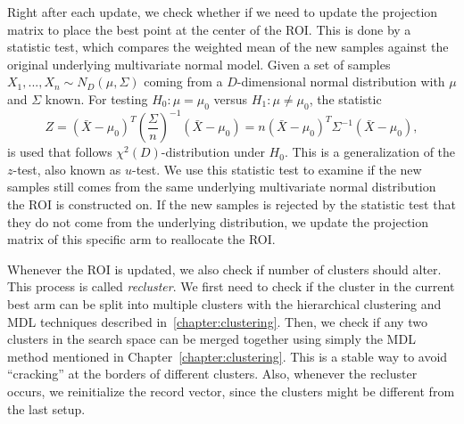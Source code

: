 Right after each update, we check whether if we need to update the projection matrix to place the best point at the center of the ROI.
This is done by a statistic test, which compares the weighted mean of the new samples against the original underlying multivariate normal model.
Given a set of samples $X_1, ..., X_n \sim N_{D}(\mu, \Sigma)$ coming from a $D$-dimensional normal distribution with $\mu$ and $\Sigma$ known. 
For testing $H_0: \mu = \mu_0$ versus $H_1: \mu \neq \mu_0$, the statistic
\begin{displaymath}
Z = ( \bar{X} - \mu_0 )^T (\frac{\Sigma}{n})^{-1} ( \bar{X} - \mu_0 ) = n( \bar{X} - \mu_0 )^T \Sigma^{-1} ( \bar{X} - \mu_0 ),
\end{displaymath}
is used that follows $ \chi^{2}(D)$-distribution under $H_0$.
This is a generalization of the $z$-test, also known as $u$-test.
We use this statistic test to examine if the new samples still comes from the same underlying multivariate normal distribution the ROI is constructed on.
If the new samples is rejected by the statistic test that they do not come from the underlying distribution, 
we update the projection matrix of this specific arm to reallocate the ROI.

Whenever the ROI is updated, we also check if number of clusters should alter.
This process is called \textit{recluster}.
We first need to check if the cluster in the current best arm can be split into multiple clusters 
with the hierarchical clustering and MDL techniques described in~\ref{chapter:clustering}.  
Then, we check if any two clusters in the search space can be merged together 
using simply the MDL method mentioned in Chapter~\ref{chapter:clustering}.  
This is a stable way to avoid ``cracking'' at the borders of different clusters.
Also, whenever the recluster occurs, we reinitialize the record vector, since the clusters might be different from the last setup.


